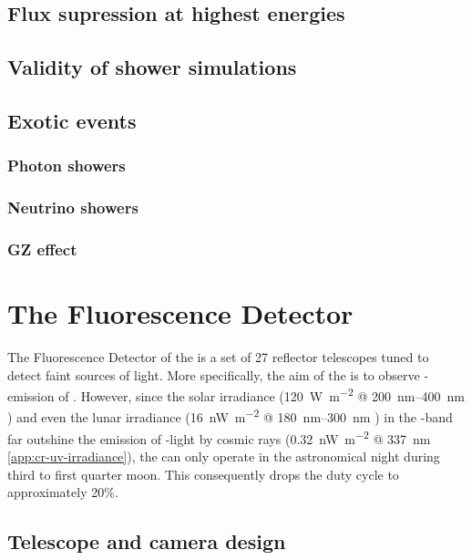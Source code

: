 \subsection{Flux supression at highest energies}
\label{ssec}

\subsection{Validity of shower simulations}


\subsection{Exotic events}
\subsubsection{Photon showers}
\subsubsection{Neutrino showers}
\subsubsection{GZ effect}

\section{The Fluorescence Detector}
\label{sec:fd}

The Fluorescence Detector of the \PAO is a set of 27 reflector telescopes tuned
to detect faint sources of \UV light. More specifically, the aim of the \FD is
to observe \UV-emission of \EAS. However, since the solar irradiance 
(\SI{120}{\watt\per\meter\squared} @
\SIrange[range-phrase={--}]{200}{400}{\nano\meter} \cite{Snow2013}) and even the
lunar irradiance (\SI{16}{\nano\watt\per\meter\squared} @
\SIrange[range-phrase={--}]{180}{300}{\nano\meter} \cite{Lean1989}) in the 
\UV-band far outshine the emission of \UV-light by cosmic rays 
(\SI{0.32}{\nano\watt\per\meter\squared} @ \SI{337}{\nano\meter} 
\cref{app:cr-uv-irradiance}), the \FD can only operate in the astronomical night
during third to first quarter moon. This consequently drops the duty cycle to 
approximately 20\%.

\subsection{Telescope and camera design}
\label{ssec:fd-design}

